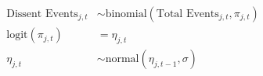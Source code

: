 \documentclass[12pt]{article}
\begin{document}
\thispagestyle{empty}

\begin{align*}
\text{Dissent Events}_{j,t} &\sim \text{binomial}(\text{Total Events}_{j,t}, \pi_{j,t})\\
\text{logit}(\pi_{j,t}) &= \eta_{j, t}\\
\eta_{j,t} &\sim \text{normal}(\eta_{j, t-1}, \sigma)
\end{align*}
\end{document}

